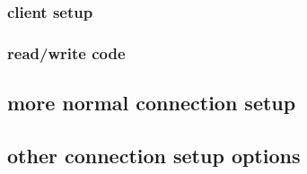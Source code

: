 \subsubsection{client setup}


\subsubsection{read/write code}



\subsection{more normal connection setup}



\subsection{other connection setup options}





